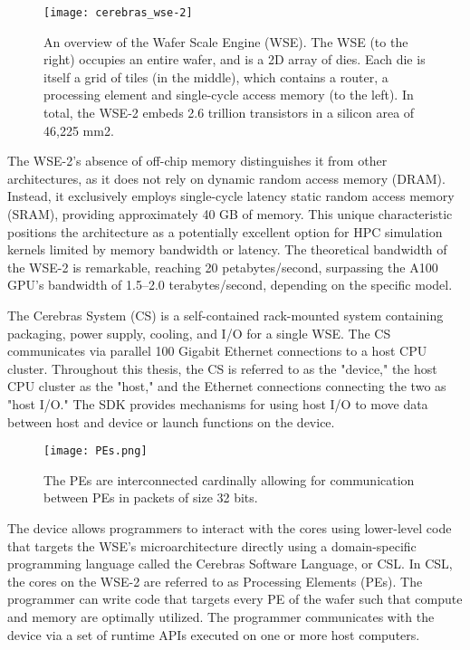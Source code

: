 \begin{figure}[h!]
    \texttt{[image: cerebras\_wse-2]}
    \centering
    \caption{An overview of the Wafer Scale Engine (WSE). The WSE (to the right) occupies an entire wafer, and is a
        2D array of dies. Each die is itself a grid of tiles (in the middle), which contains a router, a processing element and
        single-cycle access memory (to the left). In total, the WSE-2 embeds 2.6 trillion transistors in a silicon area of 46,225
        mm2. \cite{9}}
\end{figure}

The WSE-2's absence of off-chip memory distinguishes it from other architectures, as it does not rely on dynamic random access memory (DRAM). Instead, it exclusively employs single-cycle latency static random access memory (SRAM), providing approximately 40 GB of memory. This unique characteristic positions the architecture as a potentially excellent option for HPC simulation kernels limited by memory bandwidth or latency. The theoretical bandwidth of the WSE-2 is remarkable, reaching 20 petabytes/second, surpassing the A100 GPU's bandwidth of 1.5–2.0 terabytes/second, depending on the specific model.

The Cerebras System (CS) is a self-contained rack-mounted system containing packaging, power supply, cooling, and I/O for a single WSE. The CS communicates via parallel 100 Gigabit Ethernet connections to a host CPU cluster. Throughout this thesis, the CS is referred to as the "device," the host CPU cluster as the "host," and the Ethernet connections connecting the two as "host I/O." The SDK provides mechanisms for using host I/O to move data between host and device or launch functions on the device.

\begin{figure}[h!]
    \texttt{[image: PEs.png]}
    \centering
    \caption{The PEs are interconnected cardinally allowing for communication between PEs in packets of size 32 bits.}
\end{figure}

The device allows programmers to interact with the cores using lower-level code that targets the WSE's microarchitecture directly using a domain-specific programming language called the Cerebras Software Language, or CSL. In CSL, the cores on the WSE-2 are referred to as Processing Elements (PEs). The programmer can write code that targets every PE of the wafer such that compute and memory are optimally utilized. The programmer communicates with the device via a set of runtime APIs executed on one or more host computers.

